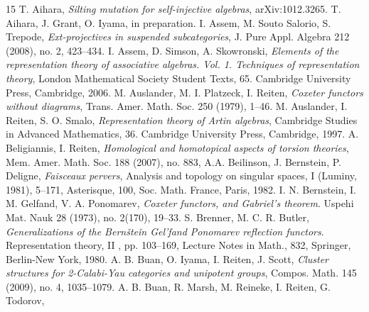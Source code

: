\documentclass[a4paper,reqno]{amsart}
\theoremstyle{definition}
\begin{document}
\begin{thebibliography}{15}
 T. Aihara, \emph{Silting mutation for self-injective algebras}, arXiv:1012.3265.
 T. Aihara, J. Grant, O. Iyama, in preparation.
 I. Assem, M. Souto Salorio, S. Trepode,
\emph{Ext-projectives in suspended subcategories},
J. Pure Appl. Algebra 212 (2008), no. 2, 423--434.
 I. Assem, D. Simson, A. Skowronski,
\emph{Elements of the representation theory of associative algebras. Vol. 1. Techniques of representation theory},
London Mathematical Society Student Texts, 65. Cambridge University Press, Cambridge, 2006.
 M. Auslander, M. I. Platzeck, I. Reiten, \emph{Coxeter functors without diagrams}, 
Trans. Amer. Math. Soc. 250 (1979), 1--46.
 M. Auslander, I. Reiten, S. O. Smalo, \emph{Representation theory of Artin algebras},
Cambridge Studies in Advanced Mathematics, 36. Cambridge University Press, Cambridge, 1997.
 A. Beligiannis, I. Reiten, \emph{Homological and homotopical aspects of torsion theories},
Mem. Amer. Math. Soc. 188 (2007), no. 883,
 A.A. Beilinson, J. Bernstein, P. Deligne, \emph{Faisceaux pervers}, Analysis and topology on singular spaces, I (Luminy, 1981), 5--171, Asterisque, 100, Soc. Math. France, Paris, 1982.
 I. N. Bernstein, I. M. Gelfand, V. A. Ponomarev, \emph{Coxeter functors, and Gabriel's theorem}.
Uspehi Mat. Nauk 28 (1973), no. 2(170), 19--33.
 S. Brenner, M. C. R. Butler, \emph{Generalizations of the Bern\v{s}te\v{i}n Gel'fand Ponomarev reflection functors}. 
Representation theory, II , pp. 103--169, Lecture Notes in Math., 832, Springer, Berlin-New York, 1980.
 A. B. Buan, O. Iyama, I. Reiten, J. Scott,
\emph{Cluster structures for 2-Calabi-Yau categories and unipotent groups},
Compos. Math. 145 (2009), no. 4, 1035--1079. 
 A. B. Buan, R. Marsh, M. Reineke, I. Reiten, G. Todorov,

\end{thebibliography}
\end{document}

